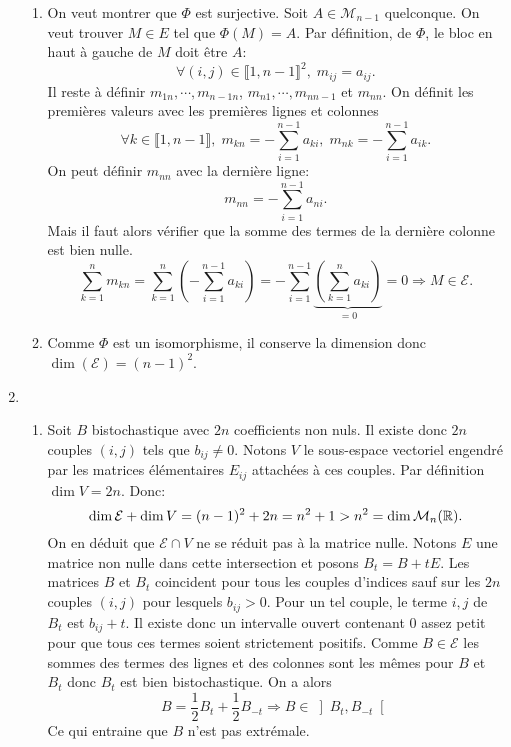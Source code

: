\begin{enumerate}
\begin{enumerate}
  \item On veut montrer que $\Phi$ est surjective. Soit $A\in \mathcal{M}_{n-1}$ quelconque. On veut trouver $M\in E$ tel que $\Phi(M)=A$.\newline
Par définition, de $\Phi$, le bloc en haut à gauche de $M$ doit être $A$:
\[
 \forall (i,j) \in \llbracket 1, n-1\rrbracket^2, \; m_{i j} = a_{i j}.
\]
Il reste à définir $m_{1 n}, \cdots, m_{n-1 n}$, $m_{n 1}, \cdots, m_{n n-1}$ et $m_{n n}$.\newline
On définit les premières valeurs avec les premières lignes et colonnes
\[
 \forall k \in \llbracket 1,n-1 \rrbracket, \; m_{k n} = - \sum_{i=1}^{n-1}a_{k i}, \; m_{n k} = - \sum_{i=1}^{n-1}a_{i k}.
\]
On peut définir $m_{n n}$ avec la dernière ligne:
\[
 m_{n n} = - \sum_{i=1}^{n-1}a_{n i}.
\]
Mais il faut alors vérifier que la somme des termes de la dernière colonne est bien nulle.
\[
\sum_{k=1}^{n} m_{k n} = \sum_{k=1}^{n}\left( - \sum_{i=1}^{n-1}a_{k i}\right) 
= -\sum_{i=1}^{n-1}\underset{ = 0}{\underbrace{\left(\sum_{k=1}^{n} a_{k i}\right)}}  = 0
\Rightarrow M \in \mathcal{E}.
\]

  \item Comme $\Phi$ est un isomorphisme, il conserve la dimension donc $\dim (\mathcal{E}) = (n-1)^2$.
 \end{enumerate}
 
 \item 
  \begin{enumerate}
  \item Soit $B$ bistochastique avec $2n$ coefficients non nuls. Il existe donc $2n$ couples $(i,j)$ tels que $b_{i j}\neq 0$. Notons $V$ le sous-espace vectoriel engendré par les matrices élémentaires $E_{i j}$ attachées à ces couples. Par définition $\dim V = 2n$. Donc:
\[
 \dim \mathcal{E} + \dim V = (n-1)^2 + 2n = n^2 + 1 > n^2 = \dim \mathcal{M}_n(\mathbb{R}).
\]
On en déduit que $\mathcal{E} \cap  V$ ne se réduit pas à la matrice nulle. Notons $E$ une matrice non nulle dans cette intersection et posons $B_t = B + t E$. Les matrices $B$ et $B_t$ coincident pour tous les couples d'indices sauf sur les $2n$ couples $(i,j)$ pour lesquels $b_{i j} > 0$. 
Pour un tel couple, le terme $i,j$ de $B_t$ est $b_{i j} + t$. Il existe donc un intervalle ouvert contenant $0$ assez petit pour que tous ces termes soient strictement positifs. Comme $B\in \mathcal{E}$ les sommes des termes des lignes et des colonnes sont les mêmes pour $B$ et $B_t$ donc $B_t$ est bien bistochastique. On a alors
\[
 B = \frac{1}{2}B_t + \frac{1}{2}B_{-t} \Rightarrow B \in \left] B_t, B_{-t}\right[ 
\]
Ce qui entraine que $B$ n'est pas extrémale.
   

\end{enumerate}
\end{enumerate}
